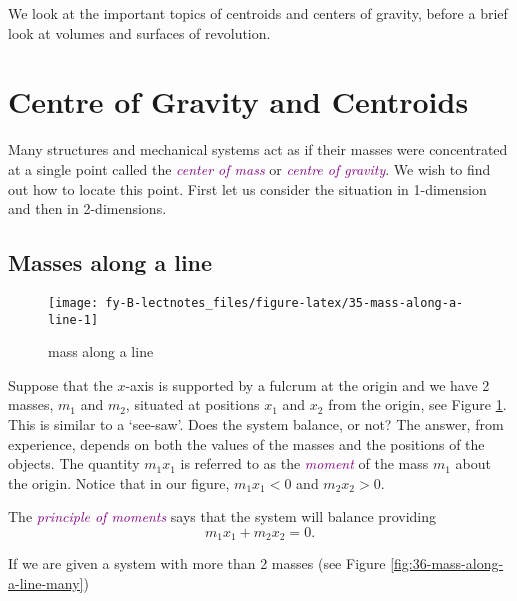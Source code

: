 \documentclass[
  english,
  11pt,
  oneside]{book}
\newcommand{\slide}{}
\theoremstyle{definition}
\theoremstyle{definition}
\theoremstyle{definition}
\theoremstyle{definition}
\theoremstyle{remark}
\begin{document}
We look at the important topics of centroids and centers of gravity, before a brief look at volumes and surfaces of revolution.

\slide

\section{Centre of Gravity and Centroids}\label{centre-of-gravity-and-centroids}

Many structures and mechanical systems act as if their masses were concentrated at a single point called the \textcolor{purple}{\em center of mass} or \textcolor{purple}{\em centre of gravity}. We wish to find out how to locate this point. First let us consider the situation in 1-dimension and then in 2-dimensions.

\slide

\subsection{Masses along a line}\label{masses-along-a-line}

\begin{figure}

{\centering \texttt{[image: fy-B-lectnotes\_files/figure-latex/35-mass-along-a-line-1]} 

}

\caption{mass along a line}\label{fig:35-mass-along-a-line}
\end{figure}

Suppose that the \(x\)-axis is supported by a fulcrum at the origin and we have 2 masses, \(m_1\) and \(m_2\), situated at positions \(x_1\) and \(x_2\) from the origin, see Figure \ref{fig:35-mass-along-a-line}. This is similar to a `see-saw'. Does the system balance, or not? The answer, from experience, depends on both the values of the masses and the positions of the objects. The quantity \(m_1x_1\) is referred to as the \textcolor{purple}{\em moment} of the mass \(m_1\) about the origin. Notice that in our figure, \(m_1x_1<0\) and \(m_2x_2>0\).

The \textcolor{purple}{\em principle of moments} says that the system will balance providing
\[
m_1x_1 + m_2x_2 = 0.
\]

\slide

If we are given a system with more than 2 masses (see Figure \ref{fig:36-mass-along-a-line-many})
\end{document}
